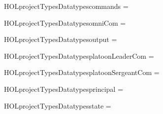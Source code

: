 \newcommand{\HOLprojectTypesDate}{27 December 2018}
\newcommand{\HOLprojectTypesTime}{13:06}
\begin{SaveVerbatim}{HOLprojectTypesDatatypescommands}
 =
     
  \HOLTokenBar{}  
  \HOLTokenBar{}  
\end{SaveVerbatim}
\newcommand{\HOLprojectTypesDatatypescommands}{\UseVerbatim{HOLprojectTypesDatatypescommands}}
\begin{SaveVerbatim}{HOLprojectTypesDatatypesomniCom}
 =  \HOLTokenBar{} 
\end{SaveVerbatim}
\newcommand{\HOLprojectTypesDatatypesomniCom}{\UseVerbatim{HOLprojectTypesDatatypesomniCom}}
\begin{SaveVerbatim}{HOLprojectTypesDatatypesoutput}
 =  \HOLTokenBar{}  \HOLTokenBar{}  \HOLTokenBar{} 
       \HOLTokenBar{}  \HOLTokenBar{}  \HOLTokenBar{} 
\end{SaveVerbatim}
\newcommand{\HOLprojectTypesDatatypesoutput}{\UseVerbatim{HOLprojectTypesDatatypesoutput}}
\begin{SaveVerbatim}{HOLprojectTypesDatatypesplatoonLeaderCom}
 =  \HOLTokenBar{}  \HOLTokenBar{} 
\end{SaveVerbatim}
\newcommand{\HOLprojectTypesDatatypesplatoonLeaderCom}{\UseVerbatim{HOLprojectTypesDatatypesplatoonLeaderCom}}
\begin{SaveVerbatim}{HOLprojectTypesDatatypesplatoonSergeantCom}
 =  \HOLTokenBar{} 
\end{SaveVerbatim}
\newcommand{\HOLprojectTypesDatatypesplatoonSergeantCom}{\UseVerbatim{HOLprojectTypesDatatypesplatoonSergeantCom}}
\begin{SaveVerbatim}{HOLprojectTypesDatatypesprincipal}
 =  \HOLTokenBar{}  \HOLTokenBar{} 
\end{SaveVerbatim}
\newcommand{\HOLprojectTypesDatatypesprincipal}{\UseVerbatim{HOLprojectTypesDatatypesprincipal}}
\begin{SaveVerbatim}{HOLprojectTypesDatatypesstate}
 =  \HOLTokenBar{}  \HOLTokenBar{}  \HOLTokenBar{}  \HOLTokenBar{} 
\end{SaveVerbatim}
